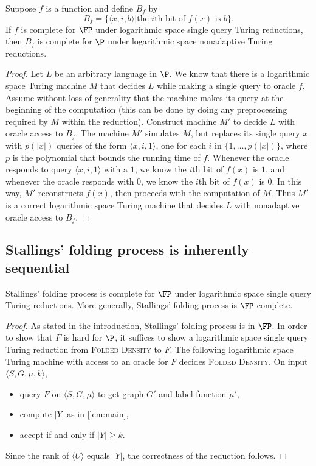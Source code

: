 \documentclass{article}
\newcommand{\FD}{\textsc{Folded Density}}
\newcommand{\gen}[1]{\langle #1 \rangle}
\begin{document}
\begin{lemma}\label{lem:nonadaptive}
  Suppose $f$ is a function and define $B_f$ by
  \begin{equation*}
    B_f = \{ \langle x, i, b \rangle | \text{the } i \text{th bit of } f(x) \text{ is } b \}.
  \end{equation*}
  If $f$ is complete for $\FP$ under logarithmic space single query Turing reductions, then $B_f$ is complete for $\P$ under logarithmic space nonadaptive Turing reductions.
\end{lemma}
\begin{proof}
  Let $L$ be an arbitrary language in $\P$.
  We know that there is a logarithmic space Turing machine $M$ that decides $L$ while making a single query to oracle $f$.
  Assume without loss of generality that the machine makes its query at the beginning of the computation (this can be done by doing any preprocessing required by $M$ within the reduction).
  Construct machine $M'$ to decide $L$ with oracle access to $B_f$.
  The machine $M'$ simulates $M$, but replaces its single query $x$ with $p(|x|)$ queries of the form $\langle x, i, 1 \rangle$, one for each $i$ in $\{1, \dotsc, p(|x|) \}$, where $p$ is the polynomial that bounds the running time of $f$.
  Whenever the oracle responds to query $\langle x, i, 1 \rangle$ with a $1$, we know the $i$th bit of $f(x)$ is $1$, and whenever the oracle responds with $0$, we know the $i$th bit of $f(x)$ is $0$.
  In this way, $M'$ reconstructs $f(x)$, then proceeds with the computation of $M$.
  Thus $M'$ is a correct logarithmic space Turing machine that decides $L$ with nonadaptive oracle access to $B_f$.
\end{proof}

\subsection{Stallings' folding process is inherently sequential}

\begin{theorem}\label{thm:fpcomplete}
  Stallings' folding process is complete for $\FP$ under logarithmic space single query Turing reductions.
  More generally, Stallings' folding process is $\FP$-complete.
\end{theorem}
\begin{proof}
  As stated in the introduction, Stallings' folding process is in $\FP$.
  In order to show that $F$ is hard for $\P$, it suffices to show a logarithmic space single query Turing reduction from \FD{} to $F$.
  The following logarithmic space Turing machine with access to an oracle for $F$ decides \FD{}.
  On input $\langle S, G, \mu, k \rangle$,
  \begin{itemize}
  \item query $F$ on $\langle S, G, \mu \rangle$ to get graph $G'$ and label function $\mu'$,
  \item compute $|Y|$ as in \autoref{lem:main},
  \item accept if and only if $|Y| \geq k$.
  \end{itemize}
  Since the rank of $\gen{U}$ equals $|Y|$, the correctness of the reduction follows.
\end{proof}
\end{document}
